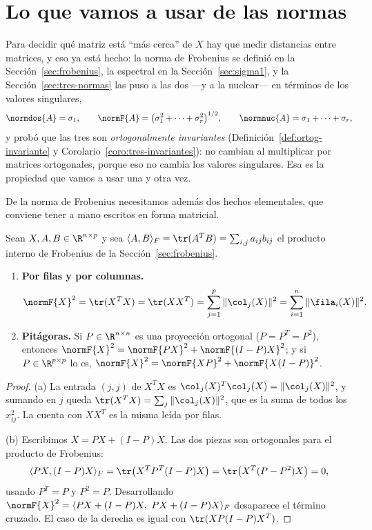 \section{Lo que vamos a usar de las normas}\label{pca-sec:normas}

Para decidir qué matriz está ``más cerca'' de $X$ hay que medir distancias
entre matrices, y eso ya está hecho: la norma de Frobenius se definió en la
Sección~\ref{sec:frobenius}, la espectral en la Sección~\ref{sec:sigma1}, y la
Sección~\ref{sec:tres-normas} las puso a las dos ---y a la nuclear--- en
términos de los valores singulares,
\[
\normdos{A}=\sigma_1,\qquad
\normF{A}=\bigl(\sigma_1^2+\dots+\sigma_r^2\bigr)^{1/2},\qquad
\normnuc{A}=\sigma_1+\dots+\sigma_r ,
\]
y probó que las tres son \emph{ortogonalmente invariantes}
(Definición~\ref{def:ortog-invariante} y Corolario~\ref{coro:tres-invariantes}):
no cambian al multiplicar por matrices ortogonales, porque eso no cambia los
valores singulares. Esa es la propiedad que vamos a usar una y otra vez.

De la norma de Frobenius necesitamos además dos hechos elementales, que
conviene tener a mano escritos en forma matricial.

\begin{proposition}\label{pca-prop:frobenius}
Sean $X,A,B\in\R^{n\times p}$ y sea
$\langle A,B\rangle_F=\tr(A^TB)=\sum_{i,j}a_{ij}b_{ij}$ el producto interno de
Frobenius de la Sección~\ref{sec:frobenius}.
\begin{enumerate}[label=(\alph*),leftmargin=*]
\item \textbf{Por filas y por columnas.}
\[
\normF{X}^2=\tr(X^TX)=\tr(XX^T)
=\sum_{j=1}^p\|\col_j(X)\|^2=\sum_{i=1}^n\|\fila_i(X)\|^2 .
\]
\item \textbf{Pitágoras.} Si $P\in\R^{n\times n}$ es una proyección ortogonal
($P=P^T=P^2$), entonces
$\normF{X}^2=\normF{PX}^2+\normF{(I-P)X}^2$; y si $P\in\R^{p\times p}$ lo es,
$\normF{X}^2=\normF{XP}^2+\normF{X(I-P)}^2$.
\end{enumerate}
\end{proposition}

\begin{proof}
(a) La entrada $(j,j)$ de $X^TX$ es $\col_j(X)^T\col_j(X)=\|\col_j(X)\|^2$, y
sumando en $j$ queda $\tr(X^TX)=\sum_j\|\col_j(X)\|^2$, que es la suma de
todos los $x_{ij}^2$. La cuenta con $XX^T$ es la misma leída por filas.

(b) Escribimos $X=PX+(I-P)X$. Las dos piezas son ortogonales para el producto
de Frobenius:
\[
\langle PX,(I-P)X\rangle_F=\tr\bigl(X^TP^T(I-P)X\bigr)
=\tr\bigl(X^T(P-P^2)X\bigr)=0 ,
\]
usando $P^T=P$ y $P^2=P$. Desarrollando
$\normF{X}^2=\langle PX+(I-P)X,\ PX+(I-P)X\rangle_F$ desaparece el término
cruzado. El caso de la derecha es igual con $\tr(XP(I-P)X^T)$.
\end{proof}

